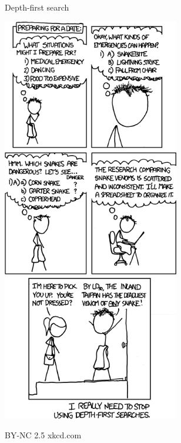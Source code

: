 \documentclass[a6paper,fontsize=10pt,twoside,open=right]{scrbook}
\begin{document}
\begin{center}
  \tiny{Depth-first search}\par
  \vspace{5pt}
  \includegraphics[keepaspectratio,width=0.58\textwidth]{elements/images/dfs_2.png}\par
  \vspace{5pt}
  \tiny{BY-NC 2.5 xkcd.com}
\end{center}
\par
\vspace*{-10pt}
\vfill
\null
\newpage

\newpage

\newpage

\vspace{15pt}

\newpage

\newpage

\vspace{15pt}

\vspace{15pt}
\end{document}
